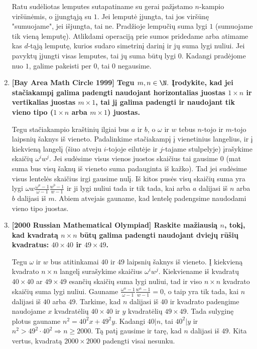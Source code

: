 \begin{enumerate}
\medskip

Ratu sudėliotas lemputes sutapatiname su gerai pažįstamo $n$-kampio viršūnėmis, o įjungtąją su $1$. Jei lemputė įjungta, tai jos viršūnę "sumuojame", jei išjungta, tai ne. Pradžioje lempučių suma lygi $1$ (sumuojame tik vieną lemputę).
Atlikdami operaciją prie sumos pridedame arba atimame kas $d$-tąją lemputę, kurios sudaro simetrinį darinį ir jų suma lygi nuliui. Jei pavyktų įjungti visas lemputes, tai jų suma būtų lygi $0$. Kadangi pradėjome nuo $1$, galime pakeisti per $0$, tai $0$ negausime.

\medskip

\item {\bf [Bay Area Math Circle 1999] Tegu $m, n \in \N.$ Įrodykite, kad jei stačiakampį galima padengti naudojant horizontalias juostas $1\times n$ ir vertikalias juostas $m\times 1$, tai jį galima padengti ir naudojant tik vieno tipo ($1\times n$ arba $m\times 1$) juostas.}   

\medskip

Tegu stačiakampio kraštinių ilgiai bus $a$ ir $b$, o $\omega$ ir $w$ tebus $n$-tojo ir $m$-tojo laipsnių šaknys iš vieneto. Padalinkime stačiakampį į vienetinius langelius, ir į kiekvieną langelį (šiuo atveju $i$-tojoje eilutėje ir $j$-tajame stulpelyje) įrašykime skaičių $\omega^iw^j$. Jei sudėsime visus vienos juostos skaičius tai gausime $0$ (mat suma bus visų šaknų iš vieneto suma padauginta iš kažko). Tad jei sudėsime visus lentelės skaičius irgi gausime nulį. Iš kitos pusės visų skaičių suma yra lygi $\omega w\frac{\omega^a - 1}{\omega-1}\frac{w^b-1}{w-1}$ ir ji lygi nuliui tada ir tik tada, kai arba $a$ dalijasi iš $n$ arba $b$ dalijasi iš $m$. Abiem atvejais gauname, kad lentelę padengsime naudodami vieno tipo juostas.

\medskip

\item {\bf [2000 Russian Mathematical Olympiad] Raskite mažiausią $n$, tokį, kad kvadratą $n\times n$ būtų galima padengti naudojant dviejų rūšių kvadratus: $40\times 40$ ir $49\times 49$.} 

\medskip

Tegu $\omega$ ir $w$ bus atitinkamai $40$ ir $49$ laipsnių šaknys iš vieneto. Į kiekvieną kvadrato $n\times n$ langelį surašykime skaičius $\omega^iw^j$. Kiekviename iš kvadratų $40\times40$ ar $49\times49$ esančių skaičių suma lygi nuliui, tad ir viso $n\times n$ kvadrato skaičių suma lygi nuliui. Gauname  $\frac{\omega^n - 1}{\omega-1}\frac{w^n-1}{w-1} = 0$, o taip yra tik tada, kai $n$ dalijasi iš $40$ arba $49$. Tarkime, kad $n$ dalijasi iš $40$ ir kvadrato padengime naudojame $x$ kvadratėlių $40\times 40$ ir $y$ kvadratėlių $49\times 49$. Tada sulyginę plotus gauname $n^2 = 40^2x + 49^2y$. Kadangi $40|n$, tai $40^2|y$ ir $n^2>49^2\cdot40^2 \Rightarrow n\geq 2000$. Tą patį gausime ir tarę, kad $n$ dalijasi iš $49$. Kita vertus, kvadratą $2000\times 2000$ padengti visai nesunku.

\end{enumerate}

